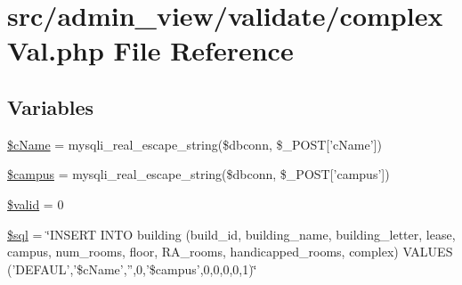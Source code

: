 \hypertarget{complexVal_8php}{\section{src/admin\-\_\-view/validate/complex\-Val.php \-File \-Reference}
\label{complexVal_8php}
}
\subsection*{\-Variables}
\begin{DoxyCompactItemize}
\item 
\hyperlink{complexVal_8php_a831a3fb4e8c6a458f33213df1511677c}{\$c\-Name} = mysqli\-\_\-real\-\_\-escape\-\_\-string(\$dbconn, \$\-\_\-\-P\-O\-S\-T\mbox{[}'c\-Name'\mbox{]})
\item 
\hyperlink{complexVal_8php_a6f0655994f3941d6ab50f681032f899b}{\$campus} = mysqli\-\_\-real\-\_\-escape\-\_\-string(\$dbconn, \$\-\_\-\-P\-O\-S\-T\mbox{[}'campus'\mbox{]})
\item 
\hyperlink{complexVal_8php_a0587674d27d00ef497e08e53ccf45bbb}{\$valid} = 0
\item 
\hyperlink{complexVal_8php_a047170d6020a882807665812a27e2525}{\$sql} = \char`\"{}\-I\-N\-S\-E\-R\-T \-I\-N\-T\-O building (build\-\_\-id, building\-\_\-name, building\-\_\-letter, lease, campus, num\-\_\-rooms, floor, \-R\-A\-\_\-rooms, handicapped\-\_\-rooms, complex) \-V\-A\-L\-U\-E\-S ('\-D\-E\-F\-A\-U\-L','\$c\-Name','',0,'\$campus',0,0,0,0,1)\char`\"{}
\end{DoxyCompactItemize}


